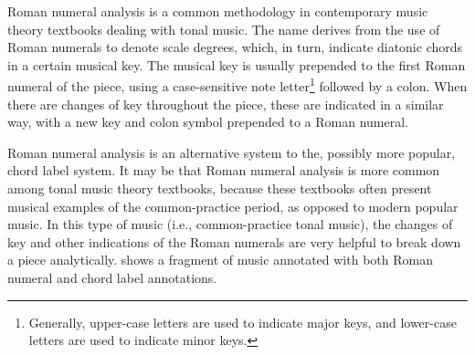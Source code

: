 Roman numeral analysis is a common methodology in
contemporary music theory textbooks dealing with tonal
music. The name derives from the use of Roman numerals to
denote scale degrees, which, in turn, indicate diatonic
chords in a certain musical key. The musical key is usually
prepended to the first Roman numeral of the piece, using a
case-sensitive note letter\footnote{Generally, upper-case
letters are used to indicate major keys, and lower-case
letters are used to indicate minor keys.} followed by a
colon. When there are changes of key throughout the piece,
these are indicated in a similar way, with a new key and
colon symbol prepended to a Roman numeral.

Roman numeral analysis is an alternative system to the,
possibly more popular, chord label system. It may be that
Roman numeral analysis is more common among tonal music
theory textbooks, because these textbooks often present
musical examples of the common-practice period, as opposed
to modern popular music. In this type of music (i.e.,
common-practice tonal music), the changes of key and other
indications of the Roman numerals are very helpful to break
down a piece analytically.  shows a fragment
of music annotated with both Roman numeral and chord label
annotations.

